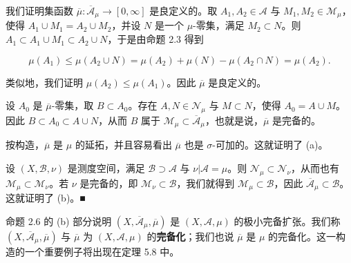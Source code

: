 \begin{proposition}
\begin{subitems}
我们证明集函数 $ \overline{\mu} : \overline{\mathcal{A}}_{\mu} \to [0, \infty] $ 是良定义的。取 $ A_{1}, A_{2} \in \mathcal{A} $ 与 $ M_{1}, M_{2} \in \mathcal{M}_{\mu} $，使得 $ A_{1} \cup M_{1} = A_{2} \cup M_{2} $，并设 $ N $ 是一个 $ \mu $-零集，满足 $ M_{2} \subset N $。则 $ A_{1} \subset A_{1} \cup M_{1} \subset A_{2} \cup N $，于是由命题 2.3 得到

\[
\mu(A_{1}) \le \mu(A_{2} \cup N) = \mu(A_{2}) + \mu(N) - \mu(A_{2} \cap N) = \mu(A_{2}) .
\]

类似地，我们证明 $ \mu(A_{2}) \le \mu(A_{1}) $。因此 $ \overline{\mu} $ 是良定义的。

\item

设 $ A_{0} $ 是 $ \overline{\mu} $-零集，取 $ B \subset A_{0} $。存在 $ A, N \in \mathcal{N}_{\mu} $ 与 $ M \subset N $，使得 $ A_{0} = A \cup M $。因此 $ B \subset A_{0} \subset A \cup N $，从而 $ B $ 属于 $ \mathcal{M}_{\mu} \subset \overline{\mathcal{A}}_{\mu} $，也就是说，$ \overline{\mu} $ 是完备的。

\item

按构造，$ \overline{\mu} $ 是 $ \mu $ 的延拓，并且容易看出 $ \overline{\mu} $ 也是 $ \sigma $-可加的。这就证明了 (a)。

\item

设 $ (X, \mathcal{B}, \nu) $ 是测度空间，满足 $ \mathcal{B} \supset \mathcal{A} $ 与 $ \nu|\mathcal{A} = \mu $。则 $ \mathcal{N}_{\mu} \subset \mathcal{N}_{\nu} $，从而也有 $ \mathcal{M}_{\mu} \subset \mathcal{M}_{\nu} $。若 $ \nu $ 是完备的，即 $ \mathcal{M}_{\nu} \subset \mathcal{B} $，我们就得到 $ \mathcal{M}_{\mu} \subset \mathcal{B} $，因此 $ \overline{\mathcal{A}}_{\mu} \subset \mathcal{B} $。这就证明了 (b)。\nobreak\hspace{0.35em}■

\end{subitems}

\end{proposition}

命题 2.6 的 (b) 部分说明 $ (X, \overline{\mathcal{A}}_{\mu}, \overline{\mu}) $ 是 $ (X, \mathcal{A}, \mu) $ 的极小完备扩张。我们称 $ (X, \overline{\mathcal{A}}_{\mu}, \overline{\mu}) $ 与 $ \overline{\mu} $ 为 $ (X, \mathcal{A}, \mu) $ 的\textbf{完备化}；我们也说 $ \overline{\mu} $ 是 $ \mu $ 的完备化。这一构造的一个重要例子将出现在定理 5.8 中。

\exerciseshead

